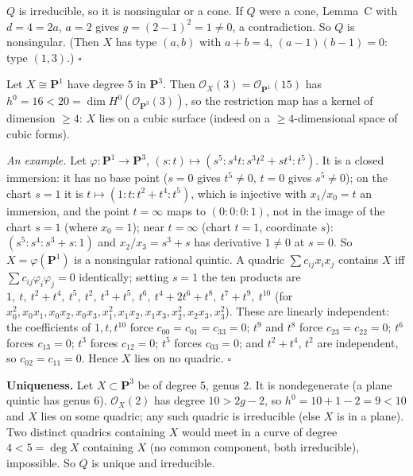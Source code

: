 \documentclass[11pt]{article}
\begin{document}
$Q$ is irreducible, so it is nonsingular or a cone. If $Q$ were a cone, Lemma~C with $d=4=2a$, $a=2$ gives $g=(2-1)^2=1\ne0$, a contradiction. So $Q$ is nonsingular. (Then $X$ has type $(a,b)$ with $a+b=4$, $(a-1)(b-1)=0$: type $(1,3)$.) \hfill$\square$

\pf
Let $X\cong\mathbf P^1$ have degree $5$ in $\mathbf P^3$. Then $\mathcal O_X(3)=\mathcal O_{\mathbf P^1}(15)$ has $h^0=16<20=\dim H^0(\mathcal O_{\mathbf P^3}(3))$, so the restriction map has a kernel of dimension $\ge4$: $X$ lies on a cubic surface (indeed on a $\ge4$-dimensional space of cubic forms).

\emph{An example.} Let $\varphi:\mathbf P^1\to\mathbf P^3$, $(s:t)\mapsto(s^5:s^4t:s^3t^2+st^4:t^5)$. It is a closed immersion: it has no base point ($s=0$ gives $t^5\ne0$, $t=0$ gives $s^5\ne0$); on the chart $s=1$ it is $t\mapsto(1:t:t^2+t^4:t^5)$, which is injective with $x_1/x_0=t$ an immersion, and the point $t=\infty$ maps to $(0:0:0:1)$, not in the image of the chart $s=1$ (where $x_0=1$); near $t=\infty$ (chart $t=1$, coordinate $s$): $(s^5:s^4:s^3+s:1)$ and $x_2/x_3=s^3+s$ has derivative $1\ne0$ at $s=0$. So $X=\varphi(\mathbf P^1)$ is a nonsingular rational quintic. A quadric $\sum c_{ij}x_ix_j$ contains $X$ iff $\sum c_{ij}\varphi_i\varphi_j=0$ identically; setting $s=1$ the ten products are $1,\ t,\ t^2+t^4,\ t^5,\ t^2,\ t^3+t^5,\ t^6,\ t^4+2t^6+t^8,\ t^7+t^9,\ t^{10}$ (for $x_0^2,x_0x_1,x_0x_2,x_0x_3,x_1^2,x_1x_2,x_1x_3,x_2^2,x_2x_3,x_3^2$). These are linearly independent: the coefficients of $1,t,t^{10}$ force $c_{00}=c_{01}=c_{33}=0$; $t^9$ and $t^8$ force $c_{23}=c_{22}=0$; $t^6$ forces $c_{13}=0$; $t^3$ forces $c_{12}=0$; $t^5$ forces $c_{03}=0$; and $t^2+t^4$, $t^2$ are independent, so $c_{02}=c_{11}=0$. Hence $X$ lies on no quadric. \hfill$\square$

\pf
\textbf{Uniqueness.} Let $X\subset\mathbf P^3$ be of degree $5$, genus $2$. It is nondegenerate (a plane quintic has genus $6$). $\mathcal O_X(2)$ has degree $10>2g-2$, so $h^0=10+1-2=9<10$ and $X$ lies on some quadric; any such quadric is irreducible (else $X$ is in a plane). Two distinct quadrics containing $X$ would meet in a curve of degree $4<5=\deg X$ containing $X$ (no common component, both irreducible), impossible. So $Q$ is unique and irreducible.
\end{document}
